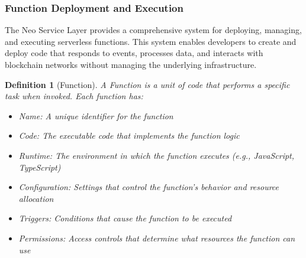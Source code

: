 \documentclass{article}
\newtheorem{definition}{Definition}
\begin{document}
\subsubsection{Function Deployment and Execution}
\label{subsubsec:function-deployment}

The Neo Service Layer provides a comprehensive system for deploying, managing, and executing serverless functions. This system enables developers to create and deploy code that responds to events, processes data, and interacts with blockchain networks without managing the underlying infrastructure.



\begin{definition}[Function]
A Function is a unit of code that performs a specific task when invoked. Each function has:
\begin{itemize}
    \item Name: A unique identifier for the function
    \item Code: The executable code that implements the function logic
    \item Runtime: The environment in which the function executes (e.g., JavaScript, TypeScript)
    \item Configuration: Settings that control the function's behavior and resource allocation
    \item Triggers: Conditions that cause the function to be executed
    \item Permissions: Access controls that determine what resources the function can use
\end{itemize}
\end{definition}
\end{document}
